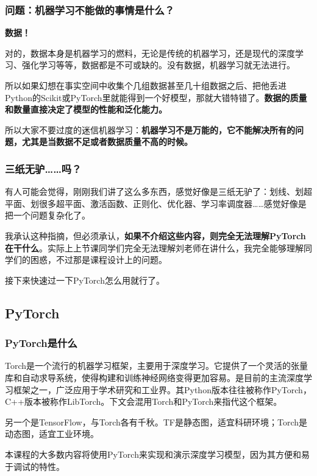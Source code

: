 \documentclass{ctexbeamer}
\begin{document}
\begin{frame}
    \frametitle{问题：机器学习不能做的事情是什么？}

    \begin{center}
        \Huge \textbf{数据！}
    \end{center}

    \hspace{2em}

    对的，数据本身是机器学习的燃料，无论是传统的机器学习，还是现代的深度学习、强化学习等等，数据都是不可或缺的。没有数据，机器学习就无法进行。

    所以如果幻想在事实空间中收集个几组数据甚至几十组数据之后、把他丢进Python的Scikit或PyTorch里就能得到一个好模型，那就大错特错了。\textbf{数据的质量和数量直接决定了模型的性能和泛化能力。}

    所以大家不要过度的迷信机器学习：\textbf{机器学习不是万能的，它不能解决所有的问题，尤其是当数据不足或者数据质量不高的时候。}

\end{frame}

\begin{frame}
    \frametitle{三纸无驴……吗？}

    有人可能会觉得，刚刚我们讲了这么多东西，感觉好像是三纸无驴了：划线、划超平面、划很多超平面、激活函数、正则化、优化器、学习率调度器……感觉好像是把一个问题复杂化了。

    我承认这种指摘，但必须承认，\textbf{如果不介绍这些内容，则完全无法理解PyTorch在干什么}。实际上上节课同学们完全无法理解刘老师在讲什么，我完全能够理解同学们的困惑，不过那是课程设计上的问题。

    接下来快速过一下PyTorch怎么用就行了。

\end{frame}

\subsection{PyTorch}

\begin{frame}[fragile]
    \frametitle{PyTorch是什么}

    Torch是一个流行的机器学习框架，主要用于深度学习。它提供了一个灵活的张量库和自动求导系统，使得构建和训练神经网络变得更加容易。是目前的主流深度学习框架之一，广泛应用于学术研究和工业界。其Python版本往往被称作PyTorch，C++版本被称作LibTorch。下文会混用Torch和PyTorch来指代这个框架。

    另一个是TensorFlow，与Torch各有千秋。TF是静态图，适宜科研环境；Torch是动态图，适宜工业环境。

    本课程的大多数内容将使用PyTorch来实现和演示深度学习模型，因为其方便和易于调试的特性。

\end{frame}
\end{document}
